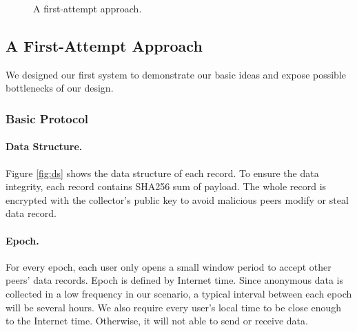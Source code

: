 \documentclass[twocolumn]{article}
\begin{document}
\begin{figure}[t]
\centering
{}
\caption{A first-attempt approach.}
\label{fig:proto}
\end{figure}

\subsection{A First-Attempt Approach}
We designed our first system to demonstrate our basic ideas and expose possible bottlenecks of our design.
\subsubsection{Basic Protocol}
\paragraph{Data Structure.} Figure \ref{fig:ds} shows the data structure of each record. To ensure the data integrity, each record contains SHA256 sum of payload. The whole record is encrypted with the collector's public key to avoid malicious peers modify or steal data record.
\paragraph{Epoch.} For every epoch, each user only opens a small window period to accept other peers' data records. Epoch is defined by Internet time. Since anonymous data is collected in a low frequency in our scenario, a typical interval between each epoch will be several hours. We also require every user's local time to be close enough to the Internet time. Otherwise, it will not able to send or receive data.
\end{document}
